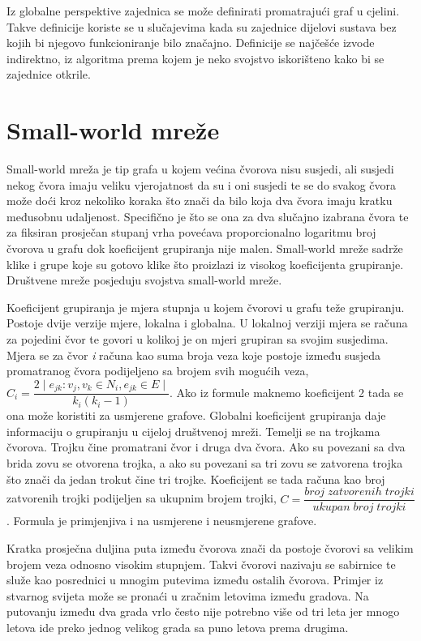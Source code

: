 Iz globalne perspektive zajednica se može definirati promatrajući graf u cjelini. Takve definicije koriste se u slučajevima kada su zajednice dijelovi sustava bez kojih bi njegovo funkcioniranje bilo značajno. Definicije se najčešće izvode indirektno, iz algoritma prema kojem je neko svojstvo iskorišteno kako bi se zajednice otkrile. 

\section{Small-world mreže}

Small-world mreža je tip grafa u kojem većina čvorova nisu susjedi, ali susjedi nekog čvora imaju veliku vjerojatnost da su i oni susjedi te se do svakog čvora može doći kroz nekoliko koraka što znači da bilo koja dva čvora imaju kratku međusobnu udaljenost. Specifično je što se ona za dva slučajno izabrana čvora te za fiksiran prosječan stupanj vrha povećava proporcionalno logaritmu broj čvorova u grafu dok koeficijent grupiranja nije malen. Small-world mreže sadrže klike i grupe koje su gotovo klike što proizlazi iz visokog koeficijenta grupiranje. Društvene mreže posjeduju svojstva small-world mreže.

Koeficijent grupiranja je mjera stupnja u kojem čvorovi u grafu teže grupiranju. Postoje dvije verzije mjere, lokalna i globalna. U lokalnoj verziji mjera se računa za pojedini čvor te govori u kolikoj je on mjeri grupiran sa svojim susjedima. Mjera se za čvor \textit{i} računa kao suma broja veza koje postoje između susjeda promatranog čvora podijeljeno sa brojem svih mogućih veza, $ C_{i} = \dfrac{2 \mid e_{jk}:v_{j},v_{k} \in N_{i}, e_{jk} \in E \mid}{k_{i}(k_{i}-1)} $. Ako iz formule maknemo koeficijent 2 tada se ona može koristiti za usmjerene grafove.
Globalni koeficijent grupiranja daje informaciju o grupiranju u cijeloj društvenoj mreži. Temelji se na trojkama čvorova. Trojku čine promatrani čvor i druga dva čvora. Ako su povezani sa dva brida zovu se otvorena trojka, a ako su povezani sa tri zovu se zatvorena trojka što znači da jedan trokut čine tri trojke. Koeficijent se tada računa kao broj zatvorenih trojki podijeljen sa ukupnim brojem trojki, $ C = \dfrac{broj \; zatvorenih \; trojki}{ukupan \; broj \; trojki} $. Formula je primjenjiva i na usmjerene i neusmjerene grafove.

Kratka prosječna duljina puta između čvorova znači da postoje čvorovi sa velikim brojem veza odnosno visokim stupnjem. Takvi čvorovi nazivaju se sabirnice te služe kao posrednici u mnogim putevima između ostalih čvorova. Primjer iz stvarnog svijeta može se pronaći u zračnim letovima između gradova. Na putovanju između dva grada vrlo često nije potrebno više od tri leta jer mnogo letova ide preko jednog velikog grada sa puno letova prema drugima. 

